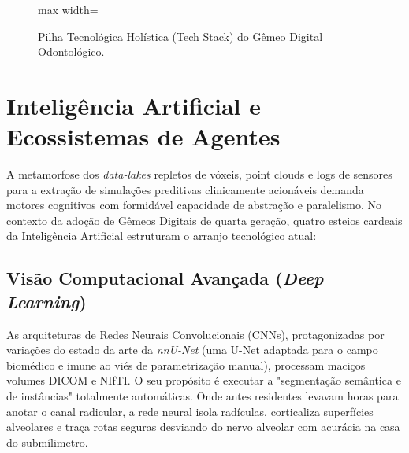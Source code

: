 \begin{figure}[htbp]
    \centering
    \begin{adjustbox}{max width=\textwidth}
\end{adjustbox}
    \caption{Pilha Tecnológica Holística (Tech Stack) do Gêmeo Digital Odontológico.}
    \label{fig:tech-stack}
\end{figure}

\section{Inteligência Artificial e Ecossistemas de Agentes}

A metamorfose dos \textit{data-lakes} repletos de vóxeis, point clouds e logs de sensores para a extração de simulações preditivas clinicamente acionáveis demanda motores cognitivos com formidável capacidade de abstração e paralelismo. No contexto da adoção de Gêmeos Digitais de quarta geração, quatro esteios cardeais da Inteligência Artificial estruturam o arranjo tecnológico atual:

\subsection{Visão Computacional Avançada (\textit{Deep Learning})}
As arquiteturas de Redes Neurais Convolucionais (CNNs), protagonizadas por variações do estado da arte da \textit{nnU-Net} (uma U-Net adaptada para o campo biomédico e imune ao viés de parametrização manual), processam maciços volumes DICOM e NIfTI. O seu propósito é executar a "segmentação semântica e de instâncias" totalmente automáticas. Onde antes residentes levavam horas para anotar o canal radicular, a rede neural isola radículas, corticaliza superfícies alveolares e traça rotas seguras desviando do nervo alveolar com acurácia na casa do submílimetro.

